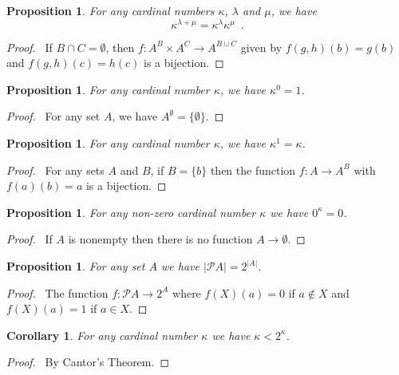 \documentclass{book}
\let\qed\relax
\newtheorem{prop}[ax]{Proposition}
\newtheorem{cor}{Corollary}[ax]
\theoremstyle{definition}
\begin{document}
\begin{prop}
For any cardinal numbers $\kappa$, $\lambda$ and $\mu$, we have
\[ \kappa^{\lambda + \mu} = \kappa^\lambda \kappa^\mu \enspace .\]
\end{prop}

\begin{proof}
\pf\ If $B \cap C = \emptyset$, then $f : A^B \times A^C \rightarrow A^{B \cup C}$ given by $f(g,h)(b) = g(b)$ and $f(g,h)(c) = h(c)$ is a bijection. \qed
\end{proof}

\begin{prop}
For any cardinal number $\kappa$, we have $\kappa^0 = 1$.
\end{prop}

\begin{proof}
\pf\ For any set $A$, we have $A^\emptyset = \{ \emptyset \}$. \qed
\end{proof}

\begin{prop}
For any cardinal number $\kappa$, we have $\kappa^1 = \kappa$.
\end{prop}

\begin{proof}
\pf\ For any sets $A$ and $B$, if $B = \{b\}$ then the function $f : A \rightarrow A^B$ with $f(a)(b) = a$ is a bijection. \qed
\end{proof}

\begin{prop}
For any non-zero cardinal number $\kappa$ we have $0^\kappa = 0$.
\end{prop}

\begin{proof}
\pf\ If $A$ is nonempty then there is no function $A \rightarrow \emptyset$. \qed
\end{proof}

\begin{prop}
For any set $A$ we have $|\mathcal{P} A| = 2^{|A|}$.
\end{prop}

\begin{proof}
\pf\ The function $f : \mathcal{P} A \rightarrow 2^A$ where $f(X)(a) = 0$ if $a \notin X$ and $f(X)(a) = 1$ if $a \in X$. \qed
\end{proof}

\begin{cor}
For any cardinal number $\kappa$ we have $\kappa < 2^\kappa$.
\end{cor}

\begin{proof}
\pf\ By Cantor's Theorem. \qed
\end{proof}
\end{document}
